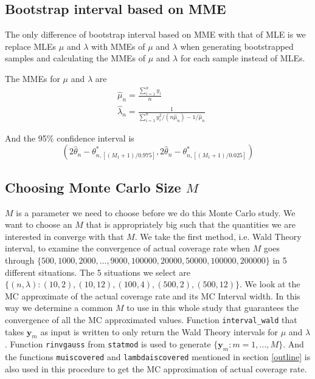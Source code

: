 \documentclass{article}
\begin{document}
	\subsection{Bootstrap interval based on MME}
	The only difference of bootstrap interval based on MME with that of MLE is we replace MLEs $\mu$ and $\lambda$ with MMEs of $\mu$ and $\lambda$ when generating bootstrapped samples and calculating the MMEs of $\mu$ and $\lambda$ for each sample instead of MLEs.

	The MMEs for $\mu$ and $\lambda$ are
	\begin{align*}
	 & \hat{\mu}_n = \frac{\sum_{i=1}^n y_i}{n}\\
	 & \hat{\lambda}_n = \frac{1}{\sum_{i=1}^n y_i^2/(n \hat{\mu}_n) - 1/\hat{\mu}_n}
	 \end{align*}

	 And the 95\% confidence interval is
	 \[\left(2 \hat{\theta}_n - \theta_{n, [(M_1 + 1)/0.975]}^*, 2 \hat{\theta}_n - \theta_{n, [(M_1 + 1)/0.025]}^*\right)\]
	  

	\subsection{Choosing Monte Carlo Size $M$}
	$M$ is a parameter we need to choose before we do this Monte Carlo study. We want to choose an $M$ that is appropriately big such that the quantities we are interested in converge with that $M$. We take the first method, i.e. Wald Theory interval, to examine the convergence of actual coverage rate when $M$ goes through $\{500, 1000, 2000, \ldots, 9000, 100000, 20000, 50000, 100000, 200000\}$ in 5 different situations. The 5 situations we select are $\{(n, \lambda): (10, 2), (10, 12), (100, 4), (500, 2), (500,12)\}$. We look at the MC approximate of the actual coverage rate and its MC Interval width. In this way we determine a common $M$ to use in this whole study that guarantees the convergence of all the MC approximated values. Function \verb|interval_wald| that takes $\bm y_m$ as input is written to only return the Wald Theory intervals for $\mu$ and $\lambda$. Function \verb|rinvgauss| from \verb|statmod| is used to generate $\{\bm y_m: m = 1, \ldots, M\}. $ And the functions \verb|muiscovered| and \verb|lambdaiscovered| mentioned in section \ref{outline} is also used in this procedure to get the MC approximation of actual coverage rate.   
\end{document}
